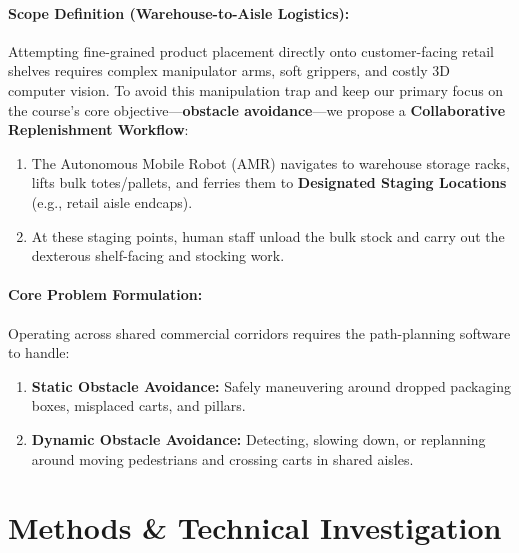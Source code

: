 \documentclass[12pt,a4paper]{article}
\begin{document}
\paragraph{Scope Definition (Warehouse-to-Aisle Logistics):}
Attempting fine-grained product placement directly onto customer-facing retail shelves requires complex manipulator arms, soft grippers, and costly 3D computer vision. To avoid this manipulation trap and keep our primary focus on the course's core objective---\textbf{obstacle avoidance}---we propose a \textbf{Collaborative Replenishment Workflow}:
\begin{enumerate}
    \item The Autonomous Mobile Robot (AMR) navigates to warehouse storage racks, lifts bulk totes/pallets, and ferries them to \textbf{Designated Staging Locations} (e.g., retail aisle endcaps).
    \item At these staging points, human staff unload the bulk stock and carry out the dexterous shelf-facing and stocking work.
\end{enumerate}

\paragraph{Core Problem Formulation:}
Operating across shared commercial corridors requires the path-planning software to handle:
\begin{enumerate}
    \item \textbf{Static Obstacle Avoidance:} Safely maneuvering around dropped packaging boxes, misplaced carts, and pillars.
    \item \textbf{Dynamic Obstacle Avoidance:} Detecting, slowing down, or replanning around moving pedestrians and crossing carts in shared aisles.
\end{enumerate}

\section{Methods \& Technical Investigation}
\end{document}
